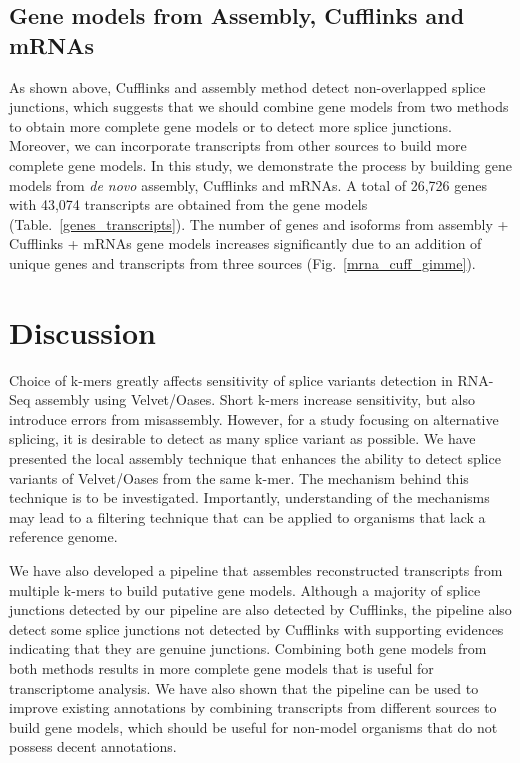\documentclass[10pt]{article}
\begin{document}
\subsection*{Gene models from Assembly, Cufflinks and mRNAs}
As shown above, Cufflinks and assembly method detect non-overlapped splice junctions,
which suggests that we should combine gene models from two methods to obtain more complete gene models or to detect more splice junctions.
Moreover, we can incorporate transcripts from other sources to build more complete gene models.
In this study, we demonstrate the process by building gene models from \emph{de novo} assembly, Cufflinks and mRNAs.
A total of 26,726 genes with 43,074 transcripts are obtained from the gene models (Table.~\ref{genes_transcripts}).
The number of genes and isoforms from assembly + Cufflinks + mRNAs gene models
increases significantly due to an addition of unique genes and transcripts from three sources (Fig.~\ref{mrna_cuff_gimme}).

\section*{Discussion}

Choice of k-mers greatly affects sensitivity of splice variants detection in RNA-Seq assembly using Velvet/Oases.
Short k-mers increase sensitivity, but also introduce errors from misassembly.
However, for a study focusing on alternative splicing, it is desirable to detect as many splice variant as possible.
We have presented the local assembly technique that enhances the ability to detect splice variants of Velvet/Oases from the same
k-mer.
The mechanism behind this technique is to be investigated.
Importantly, understanding of the mechanisms may lead to a filtering technique that can be applied to organisms that lack a reference genome.

We have also developed a pipeline that assembles reconstructed transcripts from multiple k-mers to build putative gene models.
Although a majority of splice junctions detected by our pipeline are also detected by Cufflinks, the pipeline also detect some
splice junctions not detected by Cufflinks with supporting evidences indicating that they are genuine junctions.
Combining both gene models from both methods results in more complete gene models that is useful for transcriptome analysis.
We have also shown that the pipeline can be used to improve existing annotations by combining transcripts from different sources
to build gene models, which should be useful for non-model organisms that do not possess decent annotations.
\end{document}
